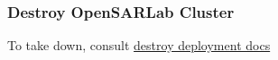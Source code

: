\subsubsection{Destroy OpenSARLab Cluster}

To take down, consult \href{/destroy\_deployment-6f6158ca5a80c78044e8f318e61a1a66.md}{destroy deployment docs}